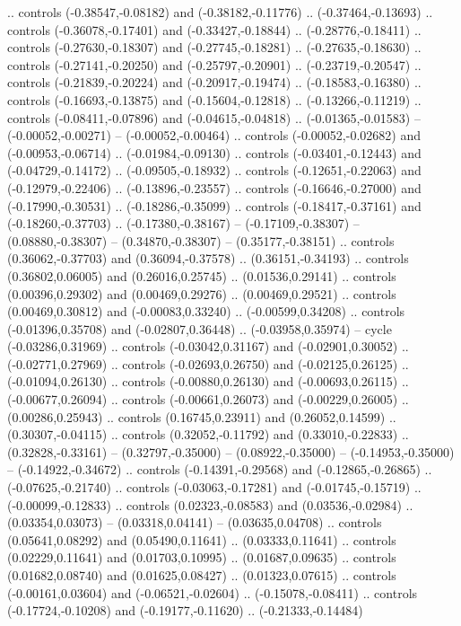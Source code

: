 {{.. controls (-0.38547,-0.08182) and (-0.38182,-0.11776) .. (-0.37464,-0.13693)
.. controls (-0.36078,-0.17401) and (-0.33427,-0.18844) .. (-0.28776,-0.18411)
.. controls (-0.27630,-0.18307) and (-0.27745,-0.18281) .. (-0.27635,-0.18630)
.. controls (-0.27141,-0.20250) and (-0.25797,-0.20901) .. (-0.23719,-0.20547)
.. controls (-0.21839,-0.20224) and (-0.20917,-0.19474) .. (-0.18583,-0.16380)
.. controls (-0.16693,-0.13875) and (-0.15604,-0.12818) .. (-0.13266,-0.11219)
.. controls (-0.08411,-0.07896) and (-0.04615,-0.04818) .. (-0.01365,-0.01583)
-- (-0.00052,-0.00271)
-- (-0.00052,-0.00464)
.. controls (-0.00052,-0.02682) and (-0.00953,-0.06714) .. (-0.01984,-0.09130)
.. controls (-0.03401,-0.12443) and (-0.04729,-0.14172) .. (-0.09505,-0.18932)
.. controls (-0.12651,-0.22063) and (-0.12979,-0.22406) .. (-0.13896,-0.23557)
.. controls (-0.16646,-0.27000) and (-0.17990,-0.30531) .. (-0.18286,-0.35099)
.. controls (-0.18417,-0.37161) and (-0.18260,-0.37703) .. (-0.17380,-0.38167)
-- (-0.17109,-0.38307)
-- (0.08880,-0.38307)
-- (0.34870,-0.38307)
-- (0.35177,-0.38151)
.. controls (0.36062,-0.37703) and (0.36094,-0.37578) .. (0.36151,-0.34193)
.. controls (0.36802,0.06005) and (0.26016,0.25745) .. (0.01536,0.29141)
.. controls (0.00396,0.29302) and (0.00469,0.29276) .. (0.00469,0.29521)
.. controls (0.00469,0.30812) and (-0.00083,0.33240) .. (-0.00599,0.34208)
.. controls (-0.01396,0.35708) and (-0.02807,0.36448) .. (-0.03958,0.35974)
-- cycle
(-0.03286,0.31969)
.. controls (-0.03042,0.31167) and (-0.02901,0.30052) .. (-0.02771,0.27969)
.. controls (-0.02693,0.26750) and (-0.02125,0.26125) .. (-0.01094,0.26130)
.. controls (-0.00880,0.26130) and (-0.00693,0.26115) .. (-0.00677,0.26094)
.. controls (-0.00661,0.26073) and (-0.00229,0.26005) .. (0.00286,0.25943)
.. controls (0.16745,0.23911) and (0.26052,0.14599) .. (0.30307,-0.04115)
.. controls (0.32052,-0.11792) and (0.33010,-0.22833) .. (0.32828,-0.33161)
-- (0.32797,-0.35000)
-- (0.08922,-0.35000)
-- (-0.14953,-0.35000)
-- (-0.14922,-0.34672)
.. controls (-0.14391,-0.29568) and (-0.12865,-0.26865) .. (-0.07625,-0.21740)
.. controls (-0.03063,-0.17281) and (-0.01745,-0.15719) .. (-0.00099,-0.12833)
.. controls (0.02323,-0.08583) and (0.03536,-0.02984) .. (0.03354,0.03073)
-- (0.03318,0.04141)
-- (0.03635,0.04708)
.. controls (0.05641,0.08292) and (0.05490,0.11641) .. (0.03333,0.11641)
.. controls (0.02229,0.11641) and (0.01703,0.10995) .. (0.01687,0.09635)
.. controls (0.01682,0.08740) and (0.01625,0.08427) .. (0.01323,0.07615)
.. controls (-0.00161,0.03604) and (-0.06521,-0.02604) .. (-0.15078,-0.08411)
.. controls (-0.17724,-0.10208) and (-0.19177,-0.11620) .. (-0.21333,-0.14484)
}}
